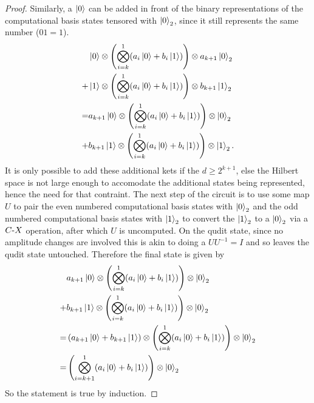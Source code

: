 \begin{proof}
    Similarly, a $\ket{0}$ can be added in front of the binary representations of the computational basis states tensored with $\ket{0}_2$, since it still represents the same number ($01 = 1$).
    \begin{align}
        &\ket{0} \otimes \left(\bigotimes_{i = k}^{1}(a_i\ket{0} + b_i\ket{1})\right)\otimes a_{k+1}\ket{0}_2\\ 
        +
        &\ket{1} \otimes \left(\bigotimes_{i = k}^{1}(a_i\ket{0} + b_i\ket{1})\right)\otimes b_{k+1}\ket{1}_2\\
        =  &a_{k+1}\ket{0} \otimes \left(\bigotimes_{i = k}^{1}(a_i\ket{0} + b_i\ket{1})\right)\otimes \ket{0}_2\\ 
        +
        &b_{k+1} \ket{1} \otimes \left(\bigotimes_{i = k}^{1}(a_i\ket{0} + b_i\ket{1})\right)\otimes \ket{1}_2.
    \end{align}
    It is only possible to add these additional kets if the $d \geq 2^{k+1}$, else the Hilbert space is not large enough to accomodate the additional states being represented, hence the need for that contraint.
    The next step of the circuit is to use some map $U$ to pair the even numbered computational basis states with $\ket{0}_2$ and the odd numbered computational basis states with $\ket{1}_2$ to convert the $\ket{1}_2$ to a $\ket{0}_2$ via a $C\text{-}X$ operation, after which $U$ is uncomputed.
    On the qudit state, since no amplitude changes are involved this is akin to doing a $UU^{-1}=I$ and so leaves the qudit state untouched.
    Therefore the final state is given by
    \begin{align}
        &a_{k+1}\ket{0} \otimes \left(\bigotimes_{i = k}^{1}(a_i\ket{0} + b_i\ket{1})\right)\otimes \ket{0}_2\\ 
        +
        &b_{k+1} \ket{1} \otimes \left(\bigotimes_{i = k}^{1}(a_i\ket{0} + b_i\ket{1})\right)\otimes \ket{0}_2\\
        =&\left(a_{k+1}\ket{0}+b_{k+1} \ket{1}\right) \otimes \left(\bigotimes_{i = k}^{1}(a_i\ket{0} + b_i\ket{1})\right)\otimes \ket{0}_2\\
        =&\left(\bigotimes_{i = k+1}^{1}(a_i\ket{0} + b_i\ket{1})\right)\otimes \ket{0}_2
    \end{align}
    So the statement is true by induction.
\end{proof}